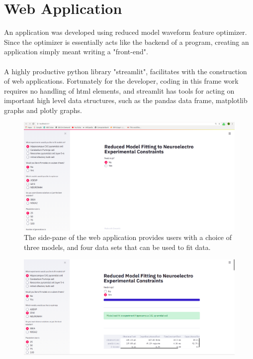 \section{Web Application}
An application was developed using reduced model waveform feature optimizer. Since the optimizer is essentially acts like the backend of a program, creating an application simply meant writing a "front-end".\\
\\
A highly productive python library "streamlit", facilitates with the construction of web applications. Fortunately for the developer, coding in this frame work requires no handling of html elements, and streamlit has tools for acting on important high level data structures, such as the pandas data frame, matplotlib graphs and plotly graphs.\\
\begin{figure}
\begin{center}

\includegraphics[scale=0.5]{chapters/app_tex/web_app_thesis}
\caption{The side-pane of the web application provides users with a choice of three models, and four data sets that can be used to fit data.
}
\end{center}

\end{figure}
\begin{figure}
\begin{center}

\includegraphics[scale=0.5]{chapters/app_tex/app_results}
\end{center}

\end{figure}

